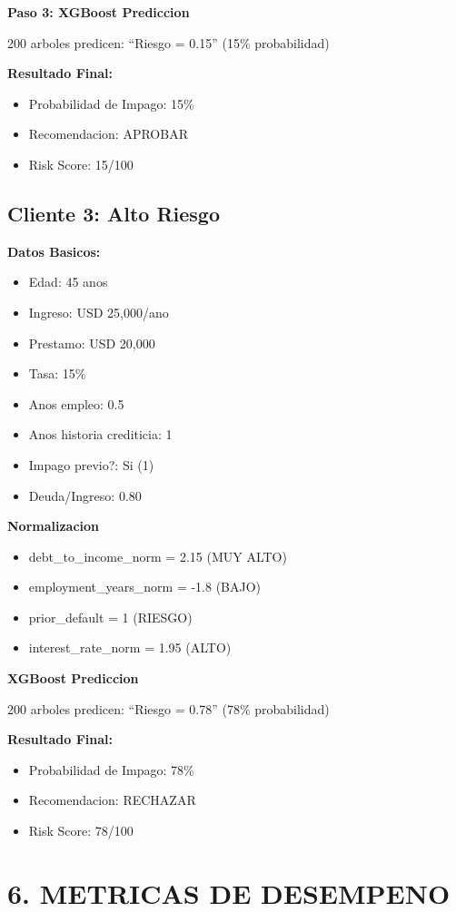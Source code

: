 \documentclass[11pt]{article}
\begin{document}
\textbf{Paso 3: XGBoost Prediccion}

200 arboles predicen: ``Riesgo = 0.15'' (15\% probabilidad)

\textbf{Resultado Final:}
\begin{itemize}
\item Probabilidad de Impago: 15\%
\item Recomendacion: APROBAR
\item Risk Score: 15/100
\end{itemize}

\subsection*{Cliente 3: Alto Riesgo}

\textbf{Datos Basicos:}
\begin{itemize}
\item Edad: 45 anos
\item Ingreso: USD 25,000/ano
\item Prestamo: USD 20,000
\item Tasa: 15\%
\item Anos empleo: 0.5
\item Anos historia crediticia: 1
\item Impago previo?: Si (1)
\item Deuda/Ingreso: 0.80
\end{itemize}

\textbf{Normalizacion}
\begin{itemize}
\item debt\_to\_income\_norm = 2.15 (MUY ALTO)
\item employment\_years\_norm = -1.8 (BAJO)
\item prior\_default = 1 (RIESGO)
\item interest\_rate\_norm = 1.95 (ALTO)
\end{itemize}

\textbf{XGBoost Prediccion}

200 arboles predicen: ``Riesgo = 0.78'' (78\% probabilidad)

\textbf{Resultado Final:}
\begin{itemize}
\item Probabilidad de Impago: 78\%
\item Recomendacion: RECHAZAR
\item Risk Score: 78/100
\end{itemize}

\section*{6. METRICAS DE DESEMPENO}
\end{document}

